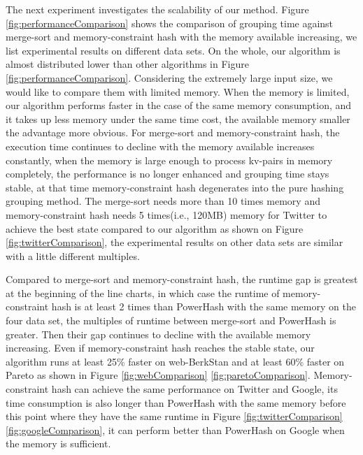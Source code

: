 The next experiment investigates the scalability of our method. Figure \ref{fig:performanceComparison} shows the comparison of grouping time against merge-sort and memory-constraint hash with the memory available increasing, we list experimental results on different data sets. 
On the whole, our algorithm is almost distributed lower than other algorithms in Figure \ref{fig:performanceComparison}. Considering the extremely large input size, we would like to compare them with limited memory. When the memory is limited, our algorithm performs faster in the case of the same memory consumption, and it takes up less memory under the same time cost, the available memory smaller the advantage more obvious. For merge-sort and memory-constraint hash, the execution time continues to decline with the memory available increases constantly, when the memory is large enough to process kv-pairs in memory completely, the performance is no longer enhanced and grouping time stays stable, at that time memory-constraint hash degenerates into the pure hashing grouping method. The merge-sort needs more than 10 times memory and memory-constraint hash needs 5 times(i.e., 120MB) memory for Twitter to achieve the best state compared to our algorithm as shown on Figure \ref{fig:twitterComparison}, the experimental results on other data sets are similar with a little different multiples.

Compared to merge-sort and memory-constraint hash, the runtime gap is greatest at the beginning of the line charts, in which case the runtime of memory-constraint hash is at least 2 times than PowerHash with the same memory on the four data set, the multiples of runtime between merge-sort and PowerHash is greater. Then their gap continues to decline with the available memory increasing. Even if memory-constraint hash reaches the stable state, our algorithm runs at least 25\% faster on web-BerkStan and at least 60\% faster on Pareto as shown in Figure \ref{fig:webComparison} \ref{fig:paretoComparison}. Memory-constraint hash can achieve the same performance on Twitter and Google, its time consumption is also longer than PowerHash with the same memory before this point where they have the same runtime in Figure \ref{fig:twitterComparison} \ref{fig:googleComparison}, it can perform better than PowerHash on Google when the memory is sufficient. 
   
